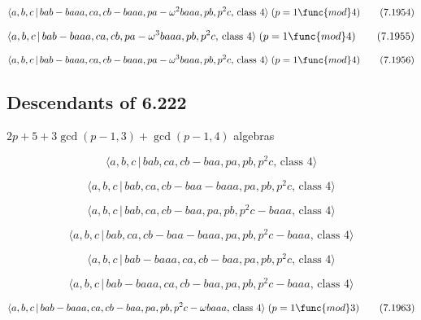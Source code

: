 \documentclass[10pt]{article}
\begin{document}
\begin{equation}
\langle a,b,c\,|\,bab-baaa,ca,cb-baaa,pa-\omega ^{2}baaa,pb,p^{2}c,\,\text{%
class }4\rangle \;(p=1\func{mod}4)  \tag{7.1954}
\end{equation}

\begin{equation}
\langle a,b,c\,|\,bab-baaa,ca,cb,pa-\omega ^{3}baaa,pb,p^{2}c,\,\text{class }%
4\rangle \;(p=1\func{mod}4)  \tag{7.1955}
\end{equation}

\begin{equation}
\langle a,b,c\,|\,bab-baaa,ca,cb-baaa,pa-\omega ^{3}baaa,pb,p^{2}c,\,\text{%
class }4\rangle \;(p=1\func{mod}4)  \tag{7.1956}
\end{equation}

\subsection{Descendants of 6.222}

$2p+5+3\gcd (p-1,3)+\gcd (p-1,4)$ algebras

\begin{equation}
\langle a,b,c\,|\,bab,ca,cb-baa,pa,pb,p^2c,\,\text{class }4\rangle 
\tag{7.1957}
\end{equation}

\begin{equation}
\langle a,b,c\,|\,bab,ca,cb-baa-baaa,pa,pb,p^2c,\,\text{class }4\rangle 
\tag{7.1958}
\end{equation}

\begin{equation}
\langle a,b,c\,|\,bab,ca,cb-baa,pa,pb,p^2c-baaa,\,\text{class }4\rangle 
\tag{7.1959}
\end{equation}

\begin{equation}
\langle a,b,c\,|\,bab,ca,cb-baa-baaa,pa,pb,p^2c-baaa,\,\text{class }4\rangle
\tag{7.1960}
\end{equation}

\begin{equation}
\langle a,b,c\,|\,bab-baaa,ca,cb-baa,pa,pb,p^2c,\,\text{class }4\rangle 
\tag{7.1961}
\end{equation}

\begin{equation}
\langle a,b,c\,|\,bab-baaa,ca,cb-baa,pa,pb,p^2c-baaa,\,\text{class }4\rangle
\tag{7.1962}
\end{equation}

\begin{equation}
\langle a,b,c\,|\,bab-baaa,ca,cb-baa,pa,pb,p^{2}c-\omega baaa,\,\text{class }%
4\rangle \;(p=1\func{mod}3)  \tag{7.1963}
\end{equation}
\end{document}
